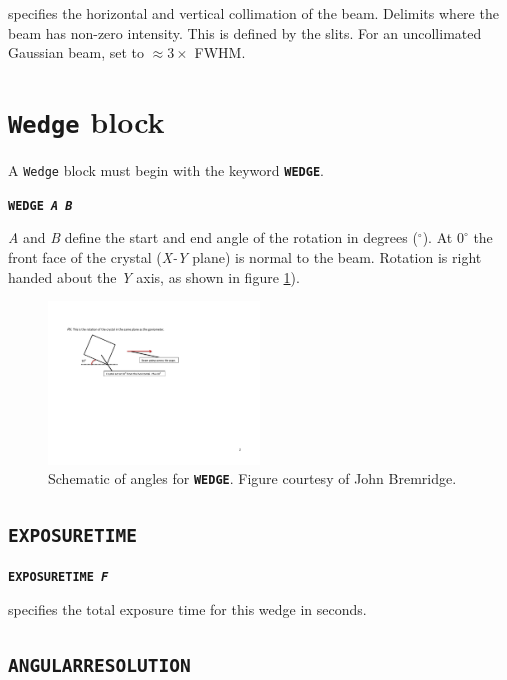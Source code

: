 \documentclass[a4paper]{article}
\newcommand{\Class}[1]{\texttt{#1}\xspace}
\newcommand{\Keyword}[1]{\texttt{\textbf{#1}}\xspace}
\begin{document}
specifies the horizontal and vertical collimation of the beam.
Delimits where the beam has non-zero intensity.
This is defined by the slits.
For an uncollimated Gaussian beam, set to $\approx 3 \times$ FWHM.

%
%

\section{\Class{Wedge} block}

A \Class{Wedge} block must begin with the keyword \Keyword{WEDGE}.

\Keyword{WEDGE \textit{A B}}

\textit{A} and \textit{B} define the start and end angle of the rotation in degrees ($^\circ$). At $0^\circ$ the front face of the crystal (\textit{X-Y} plane) is normal to the beam. Rotation is right handed about the \textit{Y} axis, as shown in figure \ref{fig:anglePhi}).
\begin{figure}[h!]
\centering
\includegraphics[width=0.5\textwidth]{Figs-for-Markus-from-JB-19-5-13-3.pdf}
\caption{Schematic of angles for \Keyword{WEDGE}. Figure courtesy of John Bremridge.}
\label{fig:anglePhi}
\end{figure}

\subsection{\Keyword{EXPOSURETIME}}

\noindent \Keyword{EXPOSURETIME \textit{F}}

specifies the total exposure time for this wedge in seconds.



\subsection{\Keyword{ANGULARRESOLUTION}}
\end{document}
